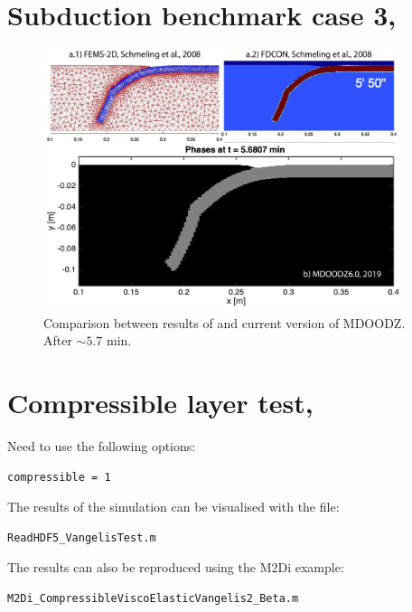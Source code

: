 \documentclass[12pt,english,openany]{scrbook}
\begin{document}
\section{Subduction benchmark case 3, \citet{Schmeling08}}

\begin{figure}[ht!]
\centerline{\includegraphics[height=3.0in]{./Figures/SubBench3_MDOODZ}}
\caption{Comparison between results of \citet{Schmeling08} and current version of MDOODZ. After $\sim5.7$ min.}
\label{SubBench3}
\end{figure}

\section{Compressible layer test, \citet{Moulas18}}

Need to use the following options:
\begin{verbatim} 
compressible = 1
\end{verbatim} %
 
The results of the simulation can be visualised with the file:
\begin{verbatim} 
ReadHDF5_VangelisTest.m
\end{verbatim}

The results can also be reproduced using the M2Di example:
\begin{verbatim} 
M2Di_CompressibleViscoElasticVangelis2_Beta.m
\end{verbatim}
\end{document}
